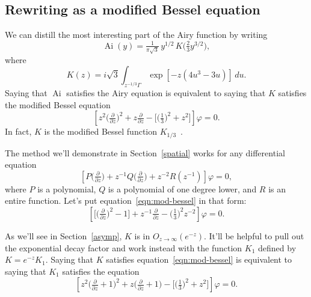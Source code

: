 \documentclass{article}
\theoremstyle{plain}
\DeclareMathOperator{\Ai}{Ai}
\begin{document}
\subsection{Rewriting as a modified Bessel equation}
We can distill the most interesting part of the Airy function by writing
\[ \Ai(y) = \tfrac{1}{\pi\sqrt{3}}\,y^{1/2}\,K\big(\tfrac{2}{3} y^{3/2}\big), \]
where
\begin{equation}\label{integral:mod-bessel}
K(z) = i\sqrt{3} \int_{z^{-1/3}\Gamma} \exp\left[-z \left(4u^3 - 3u\right)\right]\,du.
\end{equation}
Saying that $\Ai$ satisfies the Airy equation is equivalent to saying that $K$ satisfies the modified Bessel equation
\begin{equation}\label{eqn:mod-bessel}
\left[z^2 \big(\tfrac{\partial}{\partial z}\big)^2 + z \tfrac{\partial}{\partial z} - \big[\big(\tfrac{1}{3}\big)^2 + z^2\big]\right] \varphi = 0.
\end{equation}
In fact, $K$ is the modified Bessel function $K_{1/3}$~\cite[equation~9.6.1]{dlmf}.

The method we'll demonstrate in Section~\ref{spatial} works for any differential equation
\[ \left[ P\big(\tfrac{\partial}{\partial z}\big) + z^{-1} Q\big(\tfrac{\partial}{\partial z}\big) + z^{-2} R(z^{-1}) \right] \varphi = 0, \]
where $P$ is a polynomial, $Q$ is a polynomial of one degree lower, and $R$ is an entire function. Let's put equation~\ref{eqn:mod-bessel} in that form:
\begin{equation}\label{eqn:reg-mod-bessel}
\left[ \big[ \big(\tfrac{\partial}{\partial z}\big)^2 - 1 \big] + z^{-1} \tfrac{\partial}{\partial z} - \big(\tfrac{1}{3}\big)^2 z^{-2} \right] \varphi = 0.
\end{equation}

\color{violet}
As we'll see in Section~\ref{asymp}, $K$ is in $O_{z \to \infty}(e^{-z})$. It'll be helpful to pull out the exponential decay factor and work instead with the function $K_1$ defined by $K = e^{-z} K_1$. Saying that $K$ satisfies equation~\ref{eqn:mod-bessel} is equivalent to saying that $K_1$ satisfies the equation
\begin{equation}\label{eqn:shifted-mod-bessel}
\left[z^2 \big(\tfrac{\partial}{\partial z} + 1\big)^2 + z \big(\tfrac{\partial}{\partial z} + 1\big) - \big[\big(\tfrac{1}{3}\big)^2 + z^2\big]\right] \varphi = 0.
\end{equation}
\color{black}
\end{document}
